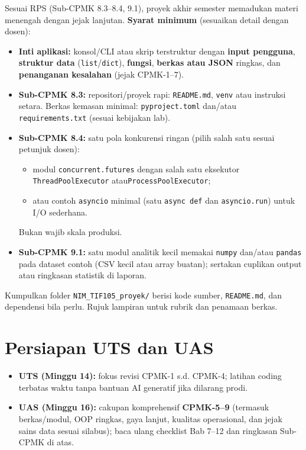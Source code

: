 \documentclass[../main.tex]{subfiles}
\begin{document}
Sesuai RPS (Sub-CPMK 8.3--8.4, 9.1), proyek akhir semester memadukan materi menengah dengan jejak lanjutan. \textbf{Syarat minimum} (sesuaikan detail dengan dosen):

\begin{itemize}[leftmargin=*]
  \item \textbf{Inti aplikasi:} konsol/CLI atau skrip terstruktur dengan \textbf{input pengguna}, \textbf{struktur data} (\texttt{list}/\texttt{dict}), \textbf{fungsi}, \textbf{berkas atau JSON} ringkas, dan \textbf{penanganan kesalahan} (jejak CPMK-1--7).
  \item \textbf{Sub-CPMK 8.3:} repositori/proyek rapi: \texttt{README.md}, \texttt{venv} atau instruksi setara.\newline
    Berkas kemasan minimal: \texttt{pyproject.toml} dan/atau \texttt{requirements.txt} (sesuai kebijakan lab).
  \item \textbf{Sub-CPMK 8.4:} satu pola konkurensi ringan (pilih salah satu sesuai petunjuk dosen):
    \begin{itemize}[leftmargin=*]
      \item modul \texttt{concurrent.futures} dengan salah satu eksekutor \texttt{ThreadPoolExecutor} atau\newline \texttt{ProcessPoolExecutor};
      \item atau contoh \texttt{asyncio} minimal (satu \texttt{async def} dan \texttt{asyncio.run}) untuk I/O sederhana.
    \end{itemize}
    Bukan wajib skala produksi.
  \item \textbf{Sub-CPMK 9.1:} satu modul analitik kecil memakai \texttt{numpy} dan/atau \texttt{pandas} pada dataset contoh (CSV kecil atau array buatan); sertakan cuplikan output atau ringkasan statistik di laporan.
\end{itemize}

\noindent Kumpulkan folder \texttt{NIM\_TIF105\_proyek/} berisi kode sumber, \texttt{README.md}, dan dependensi bila perlu. Rujuk lampiran untuk rubrik dan penamaan berkas.

\section{Persiapan UTS dan UAS}

\begin{itemize}[leftmargin=*]
  \item \textbf{UTS (Minggu 14):} fokus revisi CPMK-1 s.d. CPMK-4; latihan coding terbatas waktu tanpa bantuan AI generatif jika dilarang prodi.
  \item \textbf{UAS (Minggu 16):} cakupan komprehensif \textbf{CPMK-5--9} (termasuk berkas/modul, OOP ringkas, gaya lanjut, kualitas operasional, dan jejak sains data sesuai silabus); baca ulang checklist Bab 7--12 dan ringkasan Sub-CPMK di atas.
\end{itemize}
\end{document}
